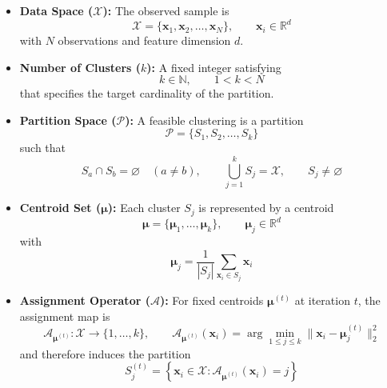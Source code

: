\begin{itemize}
  \item \textbf{Data Space ($\mathcal{X}$):} The observed sample is
  \begin{equation}
    \mathcal{X} = \{\mathbf{x}_1, \mathbf{x}_2, \dots, \mathbf{x}_N\}, \qquad \mathbf{x}_i \in \mathbb{R}^d
  \end{equation}
  with $N$ observations and feature dimension $d$.

  \item \textbf{Number of Clusters ($k$):} A fixed integer satisfying
  \begin{equation}
    k \in \mathbb{N}, \qquad 1 < k < N
  \end{equation}
  that specifies the target cardinality of the partition.

  \item \textbf{Partition Space ($\mathcal{P}$):} A feasible clustering is a partition
  \begin{equation}
    \mathcal{P} = \{S_1, S_2, \dots, S_k\}
  \end{equation}
  such that
  \begin{equation}
    S_a \cap S_b = \varnothing \quad (a \neq b), \qquad \bigcup_{j=1}^{k} S_j = \mathcal{X}, \qquad S_j \neq \varnothing
  \end{equation}

  \item \textbf{Centroid Set ($\boldsymbol{\mu}$):} Each cluster $S_j$ is represented by a centroid
  \begin{equation}
    \boldsymbol{\mu} = \{\boldsymbol{\mu}_1, \dots, \boldsymbol{\mu}_k\}, \qquad \boldsymbol{\mu}_j \in \mathbb{R}^d
  \end{equation}
  with
  \begin{equation}
    \boldsymbol{\mu}_j = \frac{1}{|S_j|}\sum_{\mathbf{x}_i \in S_j} \mathbf{x}_i
  \end{equation}

  \item \textbf{Assignment Operator ($\mathcal{A}$):} For fixed centroids $\boldsymbol{\mu}^{(t)}$ at iteration $t$, the assignment map is
  \begin{equation}
    \mathcal{A}_{\boldsymbol{\mu}^{(t)}} : \mathcal{X} \to \{1,\dots,k\}, \qquad
    \mathcal{A}_{\boldsymbol{\mu}^{(t)}}(\mathbf{x}_i) = \arg\min_{1 \le j \le k} \|\mathbf{x}_i - \boldsymbol{\mu}^{(t)}_j\|_2^2
  \end{equation}
  and therefore induces the partition
  \begin{equation}
    S_j^{(t)} = \left\{\mathbf{x}_i \in \mathcal{X} : \mathcal{A}_{\boldsymbol{\mu}^{(t)}}(\mathbf{x}_i) = j \right\}
  \end{equation}


\end{itemize}
